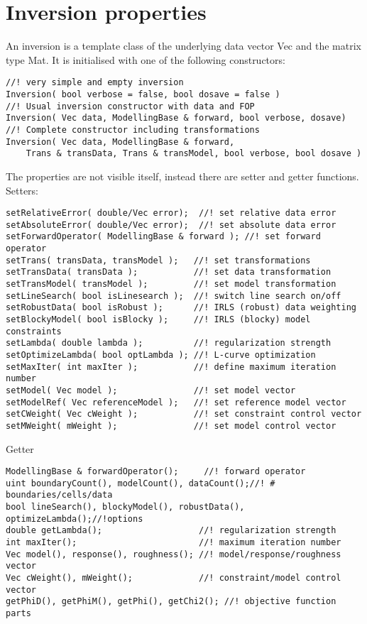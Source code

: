 \section{Inversion properties}
An inversion is a template class of the underlying data vector Vec and the matrix type Mat.
It is initialised with one of the following constructors:
\begin{lstlisting}
//! very simple and empty inversion
Inversion( bool verbose = false, bool dosave = false ) 
//! Usual inversion constructor with data and FOP
Inversion( Vec data, ModellingBase & forward, bool verbose, dosave)
//! Complete constructor including transformations
Inversion( Vec data, ModellingBase & forward, 
    Trans & transData, Trans & transModel, bool verbose, bool dosave )
\end{lstlisting}
The properties are not visible itself, instead there are setter and getter functions. Setters:
\begin{lstlisting}
setRelativeError( double/Vec error);  //! set relative data error
setAbsoluteError( double/Vec error);  //! set absolute data error
setForwardOperator( ModellingBase & forward ); //! set forward operator
setTrans( transData, transModel );   //! set transformations
setTransData( transData );           //! set data transformation
setTransModel( transModel );         //! set model transformation
setLineSearch( bool isLinesearch );  //! switch line search on/off
setRobustData( bool isRobust );      //! IRLS (robust) data weighting
setBlockyModel( bool isBlocky );     //! IRLS (blocky) model constraints
setLambda( double lambda );          //! regularization strength
setOptimizeLambda( bool optLambda ); //! L-curve optimization
setMaxIter( int maxIter );           //! define maximum iteration number
setModel( Vec model );               //! set model vector
setModelRef( Vec referenceModel );   //! set reference model vector
setCWeight( Vec cWeight );           //! set constraint control vector
setMWeight( mWeight );               //! set model control vector
\end{lstlisting}
Getter%
\begin{lstlisting}
ModellingBase & forwardOperator();     //! forward operator
uint boundaryCount(), modelCount(), dataCount();//! # boundaries/cells/data
bool lineSearch(), blockyModel(), robustData(), optimizeLambda();//!options
double getLambda();                   //! regularization strength
int maxIter();                        //! maximum iteration number
Vec model(), response(), roughness(); //! model/response/roughness vector
Vec cWeight(), mWeight();             //! constraint/model control vector
getPhiD(), getPhiM(), getPhi(), getChi2(); //! objective function parts
\end{lstlisting}
